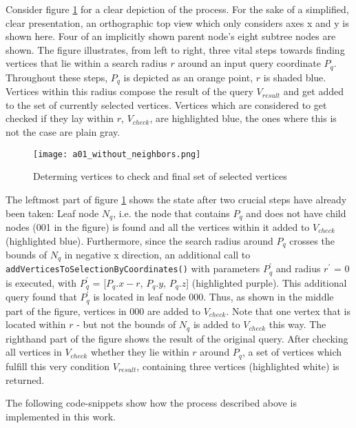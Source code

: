 Consider figure \ref{fig:a01_without_neighbours} for a clear depiction of the process. For the sake of a simplified, clear presentation, an orthographic top view which only considers axes x and y is shown here. Four of an implicitly shown parent node's eight subtree nodes are shown. The figure illustrates, from left to right, three vital steps towards finding vertices that lie within a search radius $r$ around an input query coordinate $P_q$. Throughout these steps, $P_q$ is depicted as an orange point, $r$ is shaded blue. Vertices within this radius compose the result of the query $V_{result}$ and get added to the set of currently selected vertices. Vertices which are considered to get checked if they lay within $r$, $V_{check}$, are highlighted blue, the ones where this is not the case are plain gray.

\begin{figure}[htb]
  \centering
  \texttt{[image: a01\_without\_neighbors.png]}
  \caption{Determing vertices to check and final set of selected vertices}\label{fig:a01_without_neighbours}
\end{figure}

The leftmost part of figure \ref{fig:a01_without_neighbours} shows the state after two crucial steps have already been taken: Leaf node $N_q$, i.e. the node that contains $P_q$ and does not have child nodes (001 in the figure) is found and all the vertices within it added to $V_{check}$ (highlighted blue). Furthermore, since the search radius around $P_q$ crosses the bounds of $N_q$ in negative x direction, an additional call to \texttt{addVerticesToSelectionByCoordinates()} with parameters $P_{q}^{'}$ and radius $r^{'}$ = 0 is executed, with $P_{q}^{'}$ = [$P_q.x-r$, $P_q.y$, $P_q.z$] (highlighted purple). This additional query found that $P_{q}^{'}$ is located in leaf node 000. Thus, as shown in the middle part of the figure, vertices in 000 are added to $V_{check}$. Note that one vertex that is located within $r$ - but not the bounds of $N_q$ is added to $V_{check}$ this way. The righthand part of the figure shows the result of the original query. After checking all vertices in $V_{check}$ whether they lie within $r$ around $P_q$, a set of vertices which fulfill this very condition $V_{result}$, containing three vertices (highlighted white) is returned.

The following code-snippets show how the process described above is implemented in this work.

